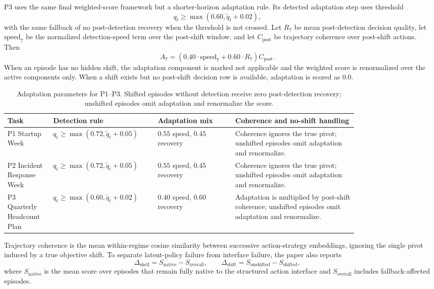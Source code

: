 P3 uses the same final weighted-score framework but a shorter-horizon
adaptation rule. Its detected adaptation step uses threshold
\[
q_t \ge \max(0.60, \tilde{q}_t + 0.02),
\]
with the same fallback of no post-detection recovery when the threshold is not
crossed. Let $R_7$ be mean post-detection decision quality, let
$\mathrm{speed}_7$ be the normalized detection-speed term over the post-shift
window, and let $C_{\mathrm{post}}$ be trajectory coherence over post-shift
actions. Then
\[
A_7 = (0.40 \cdot \mathrm{speed}_7 + 0.60 \cdot R_7) C_{\mathrm{post}}.
\]
When an episode has no hidden shift, the adaptation component is marked not
applicable and the weighted score is renormalized over the active components
only. When a shift exists but no post-shift decision row is available,
adaptation is scored as 0.0.

\begin{table}[tbp]
  \centering
  \scriptsize
  \setlength{\tabcolsep}{3pt}
  \begin{tabular}{p{0.11\linewidth}p{0.22\linewidth}p{0.19\linewidth}p{0.30\linewidth}}
    \toprule
    Task & Detection rule & Adaptation mix & Coherence and no-shift handling \\
    \midrule
    P1 Startup Week & $q_t \ge \max(0.72,\tilde{q}_t+0.05)$ & $0.55$ speed, $0.45$ recovery & Coherence ignores the true pivot; unshifted episodes omit adaptation and renormalize. \\
    P2 Incident Response Week & $q_t \ge \max(0.72,\tilde{q}_t+0.05)$ & $0.55$ speed, $0.45$ recovery & Coherence ignores the true pivot; unshifted episodes omit adaptation and renormalize. \\
    P3 Quarterly Headcount Plan & $q_t \ge \max(0.60,\tilde{q}_t+0.02)$ & $0.40$ speed, $0.60$ recovery & Adaptation is multiplied by post-shift coherence; unshifted episodes omit adaptation and renormalize. \\
    \bottomrule
  \end{tabular}
  \caption{Adaptation parameters for P1--P3. Shifted episodes without
  detection receive zero post-detection recovery; unshifted episodes omit
  adaptation and renormalize the score.}
  \label{tab:adaptparams}
\end{table}

Trajectory coherence is the mean within-regime cosine similarity between
successive action-strategy embeddings, ignoring the single pivot induced by a
true objective shift. To separate latent-policy failure from interface failure,
the paper also reports
\[
\Delta_{\mathrm{shell}} = S_{\mathrm{native}} - S_{\mathrm{overall}},
\qquad
\Delta_{\mathrm{shift}} = S_{\mathrm{unshifted}} - S_{\mathrm{shifted}},
\]
where $S_{\mathrm{native}}$ is the mean score over episodes that remain fully
native to the structured action interface and $S_{\mathrm{overall}}$ includes
fallback-affected episodes.


